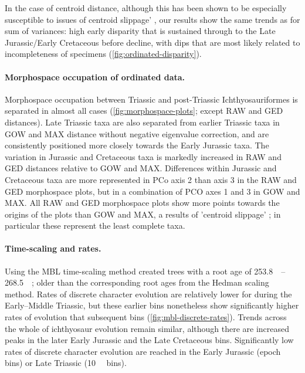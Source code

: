 \documentclass[british,a4paper]{article}
\newcommand\pcref[1]{(\cref{#1})}
\begin{document}
In the case of centroid distance, although this has been shown to be especially susceptible to issues of centroid slippage' \autocite{Flannery-Sutherland2019, Lehmann2019}, our results show the same trends as for sum of variances: high early disparity that is sustained through to the Late Jurassic/Early Cretaceous before decline, with dips that are most likely related to incompleteness of specimens (\cref{fig:ordinated-disparity}).

\paragraph{Morphospace occupation of ordinated data.}\label{par:ordinated-morphospace}

Morphospace occupation between Triassic and post-Triassic Ichthyosauriformes is separated in almost all cases (\cref{fig:morphospace-plots}; except RAW and GED distances). Late Triassic taxa are also separated from earlier Triassic taxa in GOW and MAX distance without negative eigenvalue correction, and are consistently positioned more closely towards the Early Jurassic taxa. The variation in Jurassic and Cretaceous taxa is markedly increased in RAW and GED distances relative to GOW and MAX. Differences within Jurassic and Cretaceous taxa are more represented in PCo axis 2 than axis 3 in the RAW and GED morphospace plots, but in a combination of PCO axes 1 and 3 in GOW and MAX. All RAW and GED morphospace plots show more points towards the origins of the plots than GOW and MAX, a results of 'centroid slippage' \autocite{Flannery-Sutherland2019, Lehmann2019}; in particular these represent the least complete taxa.

\paragraph{Time-scaling and rates.}\label{par:mbl-scaling-rates}

Using the MBL time-scaling method created trees with a root age of \SIrange{253.8}{268.5}{\mega\annum}; older than the corresponding root ages from the Hedman scaling method. Rates of discrete character evolution are relatively lower for during the Early–Middle Triassic, but these earlier bins nonetheless show significantly higher rates of evolution that subsequent bins \pcref{fig:mbl-discrete-rates}. Trends across the whole of ichthyosaur evolution remain similar, although there are increased peaks in the later Early Jurassic and the Late Cretaceous bins. Significantly low rates of discrete character evolution are reached in the Early Jurassic (epoch bins) or Late Triassic (\SI{10}{\mega\annum} bins).
\end{document}
